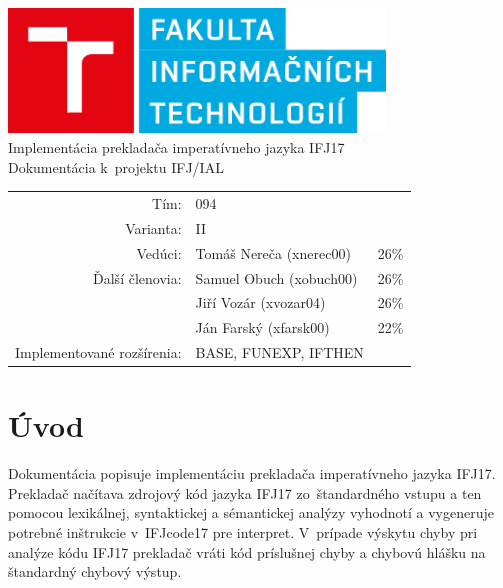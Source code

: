\documentclass{article}
\begin{document}
    \begin{titlepage}
        \begin{center}

            \includegraphics[width=10cm]{FITlogo.png}\\[30mm]

            \LARGE
            Implementácia prekladača imperatívneho jazyka IFJ17 \\
            \large
            Dokumentácia k~projektu IFJ/IAL\\[55mm]

            \begin{tabular}{r l l}
                Tím: & 094 & \\
                Varianta: & II & \\
                Vedúci: & Tomáš Nereča (xnerec00) & 26\% \\
                Ďalší členovia: & Samuel Obuch (xobuch00) & 26\% \\
                    & Jiří Vozár (xvozar04) & 26\% \\
                    & Ján Farský (xfarsk00) & 22\% \\
                Implementované rozšírenia: & BASE, FUNEXP, IFTHEN &\\
            \end{tabular}

        \end{center}
    \end{titlepage}

    \tableofcontents
    \newpage

    \section{Úvod}
        Dokumentácia popisuje implementáciu prekladača imperatívneho jazyka IFJ17. Prekladač načítava
        zdrojový kód jazyka IFJ17 zo~štandardného vstupu a ten pomocou lexikálnej, syntaktickej a sémantickej
        analýzy vyhodnotí a vygeneruje potrebné inštrukcie v~IFJcode17 pre interpret. V~prípade
        výskytu chyby pri analýze kódu IFJ17 prekladač vráti kód príslušnej chyby a chybovú hlášku na štandardný
        chybový výstup.
\end{document}
